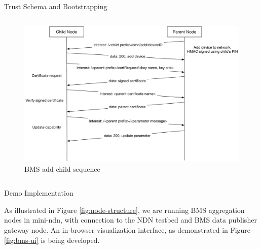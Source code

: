 \documentclass[final,hyperref={pdfpagelabels=false},20pt]{beamer}
\begin{document}
\begin{frame}[t]
\begin{columns}[t]
\begin{column}{.465\textwidth}
\begin{block}{Trust Schema and Bootstrapping}
\begin{columns}[T]
\begin{column}{.66\textwidth}
\begin{figure}
\includegraphics[width=\linewidth]{bms-add-child-sequence}
\caption{BMS add child sequence}
\label{fig:add-child-sequence}
\end{figure}
\end{column}

\end{columns}

\end{block}


\begin{block}{Demo Implementation}

As illustrated in Figure \ref{fig:node-structure}, we are running BMS aggregation nodes in mini-ndn, with connection to the NDN testbed and BMS data publisher gateway node. \newline
An in-browser visualization interface, as demonstrated in Figure \ref{fig:bms-ui} is being developed.

\begin{columns}[T]


\end{columns}
\end{block}
\end{column}
\end{columns}
\end{frame}
\end{document}
